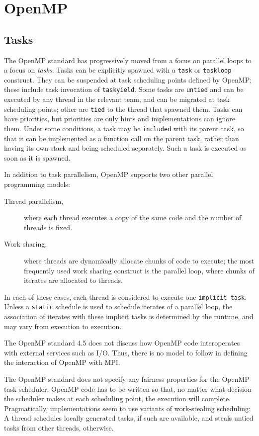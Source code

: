 	\section{OpenMP}
	\subsection{Tasks}
	The OpenMP standard has progressively moved from a focus on parallel loops 
	to a focus on \emph{tasks}. Tasks can be explicitly spawned with a 
	\texttt{task} or \texttt{taskloop} construct. They can be suspended at task 
	scheduling points defined by OpenMP; these include task invocation of 
	\texttt{taskyield}. Some tasks are \texttt{untied} and can be executed by 
	any thread in the relevant 
	team, and can be migrated at task scheduling points; other are 
	\texttt{tied}  to the thread that spawned them.
	Tasks can have priorities, but priorities are only hints and 
	implementations can ignore them. Under some conditions, a task may be 
	\texttt{included} with its parent task, so that it can be implemented as 
	a function call on the parent task, rather than having its own stack and 
	being scheduled separately. Such a task is executed as soon as it is 
	spawned. 
	
	In addition to task parallelism, OpenMP supports two other parallel 
	programming models:
	\begin{description}
		\item[Thread parallelism,] where each thread executes a copy of the 
		same code and the number of threads is fixed.
		\item[Work sharing,] where threads are dynamically allocate chunks of 
		code to execute; the most frequently used work sharing construct is the 
		parallel loop, where chunks of iterates are allocated to threads. 
	\end{description}
	In each of these cases, each thread is considered to execute one 
	\texttt{implicit task}. Unless a \texttt{static} schedule is used to 
	schedule iterates of a parallel loop, the association of iterates with 
	these implicit tasks is determined by the runtime, and may vary from 
	execution to execution.
	
	The OpenMP standard 4.5 does not discuss how OpenMP code interoperates 
	with external services such as I/O. Thus, there is no model to follow in 
	defining the interaction of OpenMP with MPI.  
	
	The OpenMP standard does not specify any fairness properties 
	for the OpenMP task scheduler. OpenMP code has to be 
	written so that, no matter what decision the scheduler makes at each 
	scheduling point, the execution will complete. Pragmatically, 
	implementations seem to use variants of work-stealing scheduling: A thread 
	schedules locally generated tasks, if such are available, and steals untied 
	tasks from other threads, otherwise.
	
